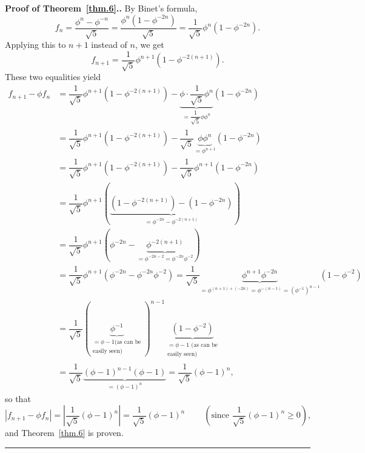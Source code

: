 \documentclass[numbers=enddot,12pt,final,onecolumn,notitlepage]{scrartcl}%
\numberwithin{exer}{section}
\theoremstyle{definition}
\newenvironment{proof}[1][Proof]{\noindent\textbf{#1.} }{\ \rule{0.5em}{0.5em}}
\begin{document}
\begin{proof}[Proof of Theorem~\ref{thm.6}.] By Binet's formula,%
\[
f_{n}=\dfrac{\phi^{n}-\phi^{-n}}{\sqrt{5}}=\dfrac{\phi^{n}\left(  1-\phi
^{-2n}\right)  }{\sqrt{5}}=\dfrac{1}{\sqrt{5}}\phi^{n}\left(  1-\phi
^{-2n}\right)  .
\]
Applying this to $n+1$ instead of $n$, we get%
\[
f_{n+1}=\dfrac{1}{\sqrt{5}}\phi^{n+1}\left(  1-\phi^{-2\left(  n+1\right)
}\right)  .
\]
These two equalities yield%
\begin{align*}
f_{n+1}-\phi f_{n}  &  =\dfrac{1}{\sqrt{5}}\phi^{n+1}\left(  1-\phi^{-2\left(
n+1\right)  }\right)  -\underbrace{\phi\cdot\dfrac{1}{\sqrt{5}}\phi^{n}%
}_{=\dfrac{1}{\sqrt{5}}\phi\phi^{n}}\left(  1-\phi^{-2n}\right) \\
&  =\dfrac{1}{\sqrt{5}}\phi^{n+1}\left(  1-\phi^{-2\left(  n+1\right)
}\right)  -\dfrac{1}{\sqrt{5}}\underbrace{\phi\phi^{n}}_{=\phi^{n+1}}\left(
1-\phi^{-2n}\right) \\
&  =\dfrac{1}{\sqrt{5}}\phi^{n+1}\left(  1-\phi^{-2\left(  n+1\right)
}\right)  -\dfrac{1}{\sqrt{5}}\phi^{n+1}\left(  1-\phi^{-2n}\right) \\
&  =\dfrac{1}{\sqrt{5}}\phi^{n+1}\left(  \underbrace{\left(  1-\phi^{-2\left(
n+1\right)  }\right)  -\left(  1-\phi^{-2n}\right)  }_{=\phi^{-2n}%
-\phi^{-2\left(  n+1\right)  }}\right) \\
&  =\dfrac{1}{\sqrt{5}}\phi^{n+1}\left(  \phi^{-2n}-\underbrace{\phi
^{-2\left(  n+1\right)  }}_{=\phi^{-2n-2}=\phi^{-2n}\phi^{-2}}\right) \\
&  =\dfrac{1}{\sqrt{5}}\phi^{n+1}\left(  \phi^{-2n}-\phi^{-2n}\phi
^{-2}\right)  =\dfrac{1}{\sqrt{5}}\underbrace{\phi^{n+1}\phi^{-2n}}%
_{=\phi^{\left(  n+1\right)  +\left(  -2n\right)  }=\phi^{-\left(  n-1\right)
}=\left(  \phi^{-1}\right)  ^{n-1}}\left(  1-\phi^{-2}\right) \\
&  =\dfrac{1}{\sqrt{5}}\left(  \underbrace{\phi^{-1}}_{\substack{=\phi-1\text{
(as can be}\\\text{easily seen)}}}\right)  ^{n-1}\underbrace{\left(
1-\phi^{-2}\right)  }_{\substack{=\phi-1\text{ (as can be}\\\text{easily
seen)}}}\\
&  =\dfrac{1}{\sqrt{5}}\underbrace{\left(  \phi-1\right)  ^{n-1}\left(
\phi-1\right)  }_{=\left(  \phi-1\right)  ^{n}}=\dfrac{1}{\sqrt{5}}\left(
\phi-1\right)  ^{n},
\end{align*}
so that%
\[
\left\vert f_{n+1}-\phi f_{n}\right\vert =\left\vert \dfrac{1}{\sqrt{5}%
}\left(  \phi-1\right)  ^{n}\right\vert =\dfrac{1}{\sqrt{5}}\left(
\phi-1\right)  ^{n}\ \ \ \ \ \ \ \ \ \ \left(  \text{since }\dfrac{1}{\sqrt
{5}}\left(  \phi-1\right)  ^{n}\geq0\right)  ,
\]
and Theorem~\ref{thm.6} is proven.
\end{proof}
\end{document}
